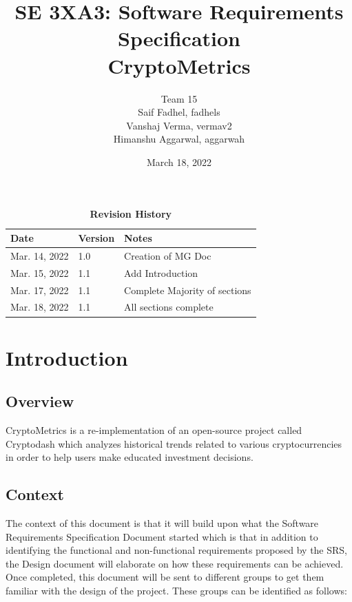 \documentclass[12pt, titlepage]{article}
\title{SE 3XA3: Software Requirements Specification\\CryptoMetrics}
\author{Team 15
		\\ Saif Fadhel, fadhels
		\\ Vanshaj Verma, vermav2
		\\ Himanshu Aggarwal, aggarwah
}
\date{March 18, 2022}
\begin{document}
\maketitle

\tableofcontents
\listoftables
\listoffigures
\newpage
\begin{table}[h!]
\caption{\bf Revision History}
\begin{tabularx}{\textwidth}{p{3cm}p{2cm}X}
\toprule {\bf Date} & {\bf Version} & {\bf Notes}\\
\midrule
Mar. 14, 2022 & 1.0 & Creation of MG Doc\\
Mar. 15, 2022 & 1.1 & Add Introduction\\
Mar. 17, 2022 & 1.1 & Complete Majority of sections\\
Mar. 18, 2022 & 1.1 & All sections complete\\
\bottomrule
\end{tabularx}
\end{table}

\newpage


\section{Introduction}

\subsection{Overview}

CryptoMetrics is a re-implementation of an open-source project called Cryptodash which analyzes historical trends related to various cryptocurrencies in order to help users make educated investment decisions.

\subsection{Context}

The context of this document is that it will build upon what the Software Requirements Specification Document started which is that in addition to identifying the functional and non-functional requirements proposed by the SRS, the Design document will elaborate on how these requirements can be achieved. Once completed, this document will be sent to different groups to get them familiar with the design of the project. These groups can be identified as follows:
\end{document}
